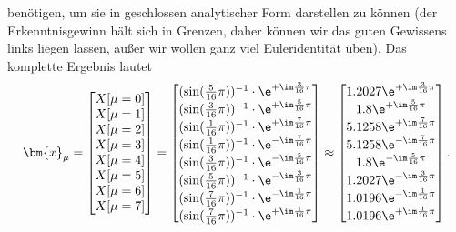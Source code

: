 \begin{ExCalc}
benötigen, um sie in geschlossen analytischer Form darstellen zu können
(der Erkenntnisgewinn hält sich in Grenzen, daher können wir das guten Gewissens
links liegen lassen, außer wir wollen ganz viel Euleridentität üben).
%
Das komplette Ergebnis lautet
\begin{align}
\bm{x}_\mu =
\begin{bmatrix}
X[\mu=0]\\X[\mu=1]\\X[\mu=2]\\X[\mu=3]\\X[\mu=4]\\X[\mu=5]\\X[\mu=6]\\X[\mu=7]
\end{bmatrix}
=
\begin{bmatrix}
(\sin(\frac{5}{16}\pi))^{-1} \cdot \e^{+\im \frac{3}{16}\pi}\\
(\sin(\frac{3}{16}\pi))^{-1} \cdot \e^{+\im \frac{5}{16}\pi}\\
(\sin(\frac{1}{16}\pi))^{-1} \cdot \e^{+\im \frac{7}{16}\pi}\\
(\sin(\frac{1}{16}\pi))^{-1} \cdot \e^{-\im \frac{7}{16}\pi}\\
(\sin(\frac{3}{16}\pi))^{-1} \cdot \e^{-\im \frac{5}{16}\pi}\\
(\sin(\frac{5}{16}\pi))^{-1} \cdot \e^{-\im \frac{3}{16}\pi}\\
(\sin(\frac{7}{16}\pi))^{-1} \cdot \e^{-\im \frac{1}{16}\pi}\\
(\sin(\frac{7}{16}\pi))^{-1} \cdot \e^{+\im \frac{1}{16}\pi}\\
\end{bmatrix}
\approx
\begin{bmatrix}
1.2027\e^{+\im \frac{3}{16}\pi}\\
1.8\e^{+\im \frac{5}{16}\pi}\\
5.1258\e^{+\im \frac{7}{16}\pi}\\
5.1258\e^{-\im \frac{7}{16}\pi}\\
1.8\e^{-\im \frac{5}{16}\pi}\\
1.2027\e^{-\im \frac{3}{16}\pi}\\
1.0196\e^{-\im \frac{1}{16}\pi}\\
1.0196\e^{+\im \frac{1}{16}\pi}\\
\end{bmatrix}.
\end{align}


\end{ExCalc}
